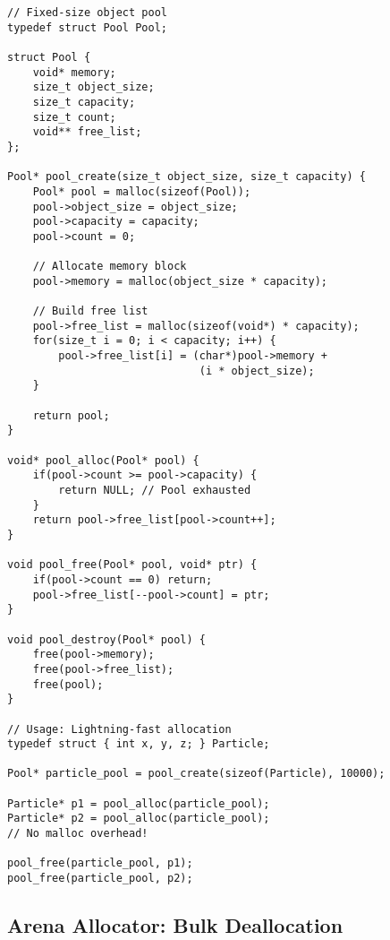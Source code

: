 \begin{lstlisting}
// Fixed-size object pool
typedef struct Pool Pool;

struct Pool {
    void* memory;
    size_t object_size;
    size_t capacity;
    size_t count;
    void** free_list;
};

Pool* pool_create(size_t object_size, size_t capacity) {
    Pool* pool = malloc(sizeof(Pool));
    pool->object_size = object_size;
    pool->capacity = capacity;
    pool->count = 0;

    // Allocate memory block
    pool->memory = malloc(object_size * capacity);

    // Build free list
    pool->free_list = malloc(sizeof(void*) * capacity);
    for(size_t i = 0; i < capacity; i++) {
        pool->free_list[i] = (char*)pool->memory +
                              (i * object_size);
    }

    return pool;
}

void* pool_alloc(Pool* pool) {
    if(pool->count >= pool->capacity) {
        return NULL; // Pool exhausted
    }
    return pool->free_list[pool->count++];
}

void pool_free(Pool* pool, void* ptr) {
    if(pool->count == 0) return;
    pool->free_list[--pool->count] = ptr;
}

void pool_destroy(Pool* pool) {
    free(pool->memory);
    free(pool->free_list);
    free(pool);
}

// Usage: Lightning-fast allocation
typedef struct { int x, y, z; } Particle;

Pool* particle_pool = pool_create(sizeof(Particle), 10000);

Particle* p1 = pool_alloc(particle_pool);
Particle* p2 = pool_alloc(particle_pool);
// No malloc overhead!

pool_free(particle_pool, p1);
pool_free(particle_pool, p2);
\end{lstlisting}

\subsection{Arena Allocator: Bulk Deallocation}


